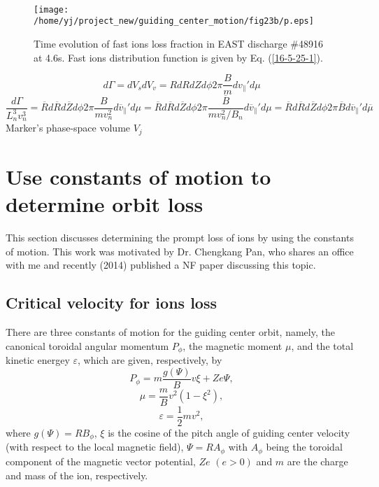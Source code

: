 \documentclass{article}
\begin{document}
\

\

\

\begin{figure}[h]
  \texttt{[image: /home/yj/project\_new/guiding\_center\_motion/fig23b/p.eps]}
  \caption{\label{16-5-25-2}Time evolution of fast ions loss fraction in EAST
  discharge \#48916 at 4.6s. Fast ions distribution function is given by Eq.
  (\ref{16-5-25-1}).}
\end{figure}


\[ d \Gamma = d V_s d V_v = R d R d Z d \phi 2 \pi \frac{B}{m} d
   v_{\parallel}' d \mu \]
\begin{equation}
  \frac{d \Gamma}{L_n^3 v_n^3} = \overline{R} d \overline{R} d \overline{Z} d
  \phi 2 \pi \frac{B}{m v_n^2} d \overline{v}_{\parallel}' d \mu =
  \overline{R} d \overline{R} d \overline{Z} d \phi 2 \pi \frac{
  \overline{B}}{m v_n^2 / B_n} d \overline{v}_{\parallel}' d \mu =
  \overline{R} d \overline{R} d \overline{Z} d \phi 2 \pi \overline{B} d
  \overline{v}_{\parallel}' d \overline{\mu}
\end{equation}
Marker's phase-space volume $V_j$

\section{Use constants of motion to determine orbit loss}

This section discusses determining the prompt loss of ions by using the
constants of motion. This work was motivated by Dr. Chengkang Pan, who shares
an office with me and recently (2014) published a NF paper discussing this
topic.

\subsection{Critical velocity for ions loss}

There are three constants of motion for the guiding center orbit, namely, the
canonical toroidal angular momentum $P_{\phi}$, the magnetic moment $\mu$, and
the total kinetic energey $\varepsilon$, which are given, respectively, by
\begin{equation}
  P_{\phi} = m \frac{g (\Psi) }{B} v \xi + Z e \Psi,
\end{equation}
\begin{equation}
  \mu = \frac{m}{B} v^2 (1 - \xi^2),
\end{equation}
\begin{equation}
  \varepsilon = \frac{1}{2} m v^2,
\end{equation}
where $g (\Psi) = R B_{\phi}$, $\xi$ is the cosine of the pitch angle of
guiding center velocity (with respect to the local magnetic field), $\Psi = R
A_{\phi}$ with $A_{\phi}$ being the toroidal component of the magnetic vector
potential, $Z e$ $(e > 0)$ and $m$ are the charge and mass of the ion,
respectively.
\end{document}
